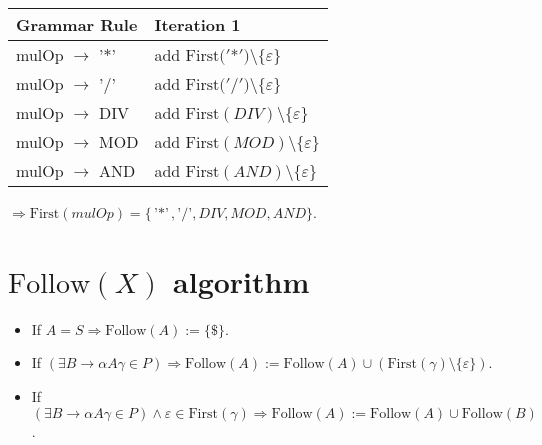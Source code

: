 \documentclass[8pt]{scrartcl}
\newcommand{\First}[1]{\mathrm{First}(#1)}
\newcommand{\Follow}[1]{\mathrm{Follow}(#1)}
\newcommand{\epsset}{\{\varepsilon\}}
\begin{document}
\begin{itemize}
\begin{tabular}{|l |l |}
                    \hline
                    \textbf{Grammar Rule} & \textbf{Iteration 1}\\
                    \hline
                    mulOp $\rightarrow$ '$*$' & add $\First{'$*$'} \setminus \epsset$\\
                    \hline
                    mulOp $\rightarrow$ '$/$' & add $\First{'$/$'} \setminus \epsset$\\
                    \hline
                    mulOp $\rightarrow$ DIV & add $\First{DIV} \setminus \epsset$\\
                    \hline
                    mulOp $\rightarrow$ MOD & add $\First{MOD} \setminus \epsset$\\
                    \hline
                    mulOp $\rightarrow$ AND & add $\First{AND} \setminus \epsset$\\
                    \hline
                \end{tabular}\newline
                $\Rightarrow \First{mulOp} = \{\text{'$*$'}, \text{'$/$'}, DIV, MOD, AND\}$.
        \end{itemize}
    \section{$\Follow{X}$ \textbf{algorithm}}
        \begin{itemize}
            \item If $A = S \Rightarrow \Follow{A} := \{\$\}$.
            \item If $\left(\exists B \rightarrow \alpha A \gamma \in P\right) \Rightarrow \Follow{A} := \Follow{A} \cup \left(\First{\gamma} \setminus \epsset\right)$.
            \item If $\left(\exists B \rightarrow \alpha A \gamma \in P\right) \wedge \varepsilon \in \First{\gamma} \Rightarrow \Follow{A} := \Follow{A} \cup \Follow{B}$.
        \end{itemize}
\end{document}
